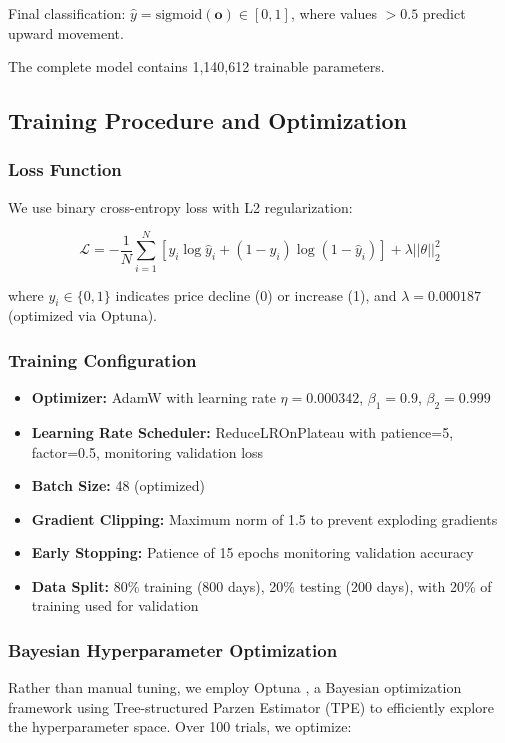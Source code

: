\documentclass[conference]{IEEEtran}
\begin{document}
\item Final classification: $\hat{y} = \text{sigmoid}(\mathbf{o}) \in [0,1]$, where values $> 0.5$ predict upward movement.

The complete model contains 1,140,612 trainable parameters.

\subsection{Training Procedure and Optimization}

\subsubsection{Loss Function}
We use binary cross-entropy loss with L2 regularization:

\begin{equation}
\mathcal{L} = -\frac{1}{N}\sum_{i=1}^{N} [y_i \log \hat{y}_i + (1-y_i)\log(1-\hat{y}_i)] + \lambda ||\theta||_2^2
\end{equation}

where $y_i \in \{0,1\}$ indicates price decline (0) or increase (1), and $\lambda = 0.000187$ (optimized via Optuna).

\subsubsection{Training Configuration}
\begin{itemize}
\item \textbf{Optimizer:} AdamW with learning rate $\eta = 0.000342$, $\beta_1 = 0.9$, $\beta_2 = 0.999$
\item \textbf{Learning Rate Scheduler:} ReduceLROnPlateau with patience=5, factor=0.5, monitoring validation loss
\item \textbf{Batch Size:} 48 (optimized)
\item \textbf{Gradient Clipping:} Maximum norm of 1.5 to prevent exploding gradients
\item \textbf{Early Stopping:} Patience of 15 epochs monitoring validation accuracy
\item \textbf{Data Split:} 80\% training (800 days), 20\% testing (200 days), with 20\% of training used for validation
\end{itemize}

\subsubsection{Bayesian Hyperparameter Optimization}
Rather than manual tuning, we employ Optuna \cite{akiba2019optuna}, a Bayesian optimization framework using Tree-structured Parzen Estimator (TPE) to efficiently explore the hyperparameter space. Over 100 trials, we optimize:
\end{document}
